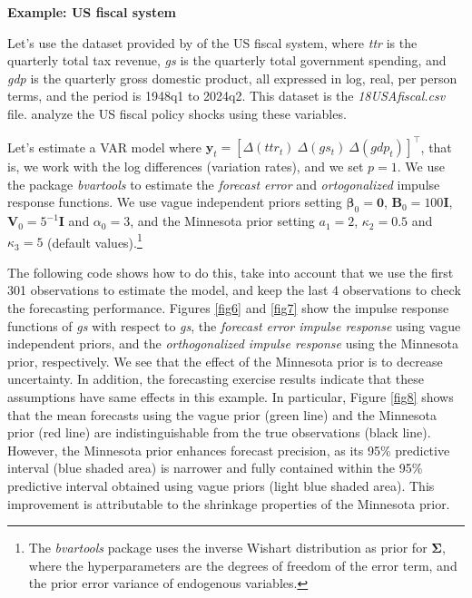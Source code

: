 \textbf{Example: US fiscal system}

Let's use the dataset provided by \cite{Tomasz2024} of the US fiscal system, where \textit{ttr} is the quarterly total tax revenue, \textit{gs} is the quarterly total government spending, and \textit{gdp} is the quarterly gross domestic product, all expressed in log, real, per person terms, and the period is 1948q1 to 2024q2. This dataset is the \textit{18USAfiscal.csv} file. \cite{mertens2014reconciliation} analyze the US fiscal policy shocks using these variables.

Let's estimate a VAR model where $\bm{y}_t=[\Delta(ttr_t) \ \Delta(gs_t) \ \Delta(gdp_t)]^{\top}$, that is, we work with the log differences (variation rates), and we set $p=1$. We use the package \textit{bvartools} to estimate the \textit{forecast error} and \textit{ortogonalized} impulse response functions. We use vague independent priors setting $\bm{\beta}_0=\bm{0}$, $\bm{B}_0=100\bm{I}$, $\bm{V}_0=5^{-1}\bm{I}$ and $\alpha_0=3$, and the Minnesota prior setting $a_1=2$, $\kappa_2=0.5$ and $\kappa_3=5$ (default values).\footnote{The \textit{bvartools} package uses the inverse Wishart distribution as prior for $\bm{\Sigma}$, where the hyperparameters are the degrees of freedom of the error term, and the prior error variance of endogenous variables.}

The following code shows how to do this, take into account that we use the first 301 observations to estimate the model, and keep the last 4 observations to check the forecasting performance. Figures \ref{fig6} and \ref{fig7} show the impulse response functions of \textit{gs} with respect to \textit{gs}, the \textit{forecast error impulse response} using vague independent priors, and the \textit{orthogonalized impulse response} using the Minnesota prior, respectively. We see that the effect of the Minnesota prior is to decrease uncertainty. In addition, the forecasting exercise results indicate that these assumptions have same effects in this example. In particular, Figure \ref{fig8} shows that the mean forecasts using the vague prior (green line) and the Minnesota prior (red line) are indistinguishable from the true observations (black line). However, the Minnesota prior enhances forecast precision, as its 95\% predictive interval (blue shaded area) is narrower and fully contained within the 95\% predictive interval obtained using vague priors (light blue shaded area). This improvement is attributable to the shrinkage properties of the Minnesota prior.

